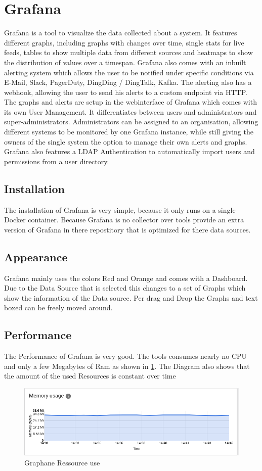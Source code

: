 \section{Grafana}
\label{grafana} %
Grafana is a tool to visualize the data collected about a system. It features different graphs, including graphs with changes over time, single stats for live feeds, tables to show multiple data from different sources and heatmaps to show the distribution of values over a timespan.
Grafana also comes with an inbuilt alerting system which allows the user to be notified under specific conditions via E-Mail, Slack, PagerDuty, DingDing / DingTalk, Kafka. The alerting also has a webhook, allowing the user to send his alerts to a custom endpoint via HTTP.
The graphs and alerts are setup in the webinterface of Grafana which comes with its own User Management. It differentiates between users and administrators and super-administrators. Administrators can be assigned to an organisation, allowing different systems to be monitored by one Grafana instance, while still giving the owners of the single system the option to manage their own alerts and graphs.
Grafana also features a LDAP Authentication to automatically import users and permissions from a user directory.
\subsection{Installation}
The installation of Grafana is very simple, because it only runs on a single Docker container. Because Grafana is no collector over tools provide an extra version of Grafana in there repostitory that is optimized for there data sources.
\subsection{Appearance}%
Grafana mainly uses the colors Red and Orange and comes with a Dashboard. Due to the Data Source that is selected this changes to a set of Graphs which show the information of the Data source. Per drag and Drop the Graphs and text boxed can be freely moved around. 
\subsection{Performance}
The Performance of Grafana is very good. The tools consumes  nearly no CPU and only a few Megabytes of Ram as shown in \cref{fig:Grafan_RAM}. The Diagram also shows that the amount of the used Resources is constant over time
\begin{figure}
\centering
\includegraphics[width=\textwidth]{Bilder/Performance/Grafan_RAM}
\caption{Graphane Ressource use}
\label{fig:Grafan_RAM}
\end{figure}
